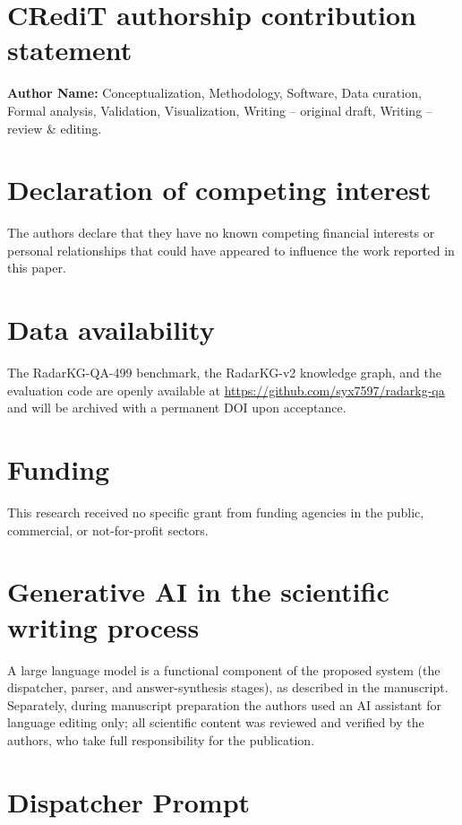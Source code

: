 \documentclass[review]{elsarticle}
\begin{document}
\section*{CRediT authorship contribution statement}
\textbf{Author Name:} Conceptualization, Methodology, Software, Data curation, Formal analysis, Validation, Visualization, Writing -- original draft, Writing -- review \& editing.

\section*{Declaration of competing interest}
The authors declare that they have no known competing financial interests or personal relationships that could have appeared to influence the work reported in this paper.

\section*{Data availability}
The RadarKG-QA-499 benchmark, the RadarKG-v2 knowledge graph, and the evaluation code are openly available at \url{https://github.com/syx7597/radarkg-qa} and will be archived with a permanent DOI upon acceptance.

\section*{Funding}
This research received no specific grant from funding agencies in the public, commercial, or not-for-profit sectors.

\section*{Generative AI in the scientific writing process}
A large language model is a functional component of the proposed system (the dispatcher, parser, and answer-synthesis stages), as described in the manuscript. Separately, during manuscript preparation the authors used an AI assistant for language editing only; all scientific content was reviewed and verified by the authors, who take full responsibility for the publication.




\appendix
\section{Dispatcher Prompt}
\label{app:dispatcher}
\end{document}
